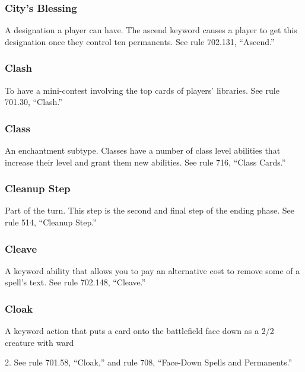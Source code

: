 {{{\subsubsection*{City’s Blessing}

A designation a player can have. The ascend keyword causes a player to get this designation once they control ten permanents. See rule 702.131, “Ascend.”

\subsubsection*{Clash}

To have a mini-contest involving the top cards of players’ libraries. See rule 701.30, “Clash.”

\subsubsection*{Class}

An enchantment subtype. Classes have a number of class level abilities that increase their level and grant them new abilities. See rule 716, “Class Cards.”

\subsubsection*{Cleanup Step}

Part of the turn. This step is the second and final step of the ending phase. See rule 514, “Cleanup Step.”

\subsubsection*{Cleave}

A keyword ability that allows you to pay an alternative cost to remove some of a spell’s text. See rule 702.148, “Cleave.”

\subsubsection*{Cloak}

A keyword action that puts a card onto the battlefield face down as a 2/2 creature with ward {2. See rule 701.58, “Cloak,” and rule 708, “Face-Down Spells and Permanents.”

}}}}
